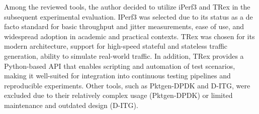 Among the reviewed tools, the author decided to utilize iPerf3 and TRex in the subsequent experimental evaluation. 
IPerf3 was selected due to its status as a de facto standard for basic throughput and jitter measurements, ease of use, and widespread adoption in academic and practical contexts. 
TRex was chosen for its modern architecture, support for high-speed stateful and stateless traffic generation, ability to simulate real-world traffic. 
In addition, TRex provides a Python-based API that enables scripting and automation of test scenarios, making it well-suited for integration into continuous testing pipelines and reproducible experiments. 
Other tools, such as Pktgen-DPDK and D-ITG, were excluded due to their relatively complex usage (Pktgen-DPDK) or limited maintenance and outdated design (D-ITG).

